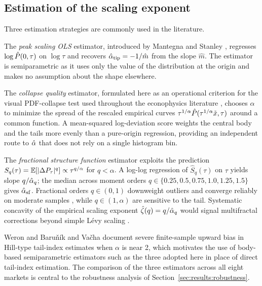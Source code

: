 \documentclass[conference]{IEEEtran}
\begin{document}
\subsection{Estimation of the scaling exponent}
\label{sec:background:estimation}

Three estimation strategies are commonly used in the literature.

The \textit{peak scaling OLS} estimator, introduced by
Mantegna and Stanley \cite{MantegnaStanley1994}, regresses $\log\hat{P}(0,\tau)$ on $\log\tau$ and
recovers $\hat{\alpha}_{\mathrm{tip}} = -1/\hat{m}$ from the slope $\hat{m}$.
The estimator is semiparametric as it uses only the value of the distribution
at the origin and makes no assumption about the shape elsewhere.

The \textit{collapse quality} estimator, formulated here as an operational
criterion for the visual PDF-collapse test used throughout the econophysics
literature \cite{MantegnaStanley1995,Gopikrishnan1999}, chooses
$\alpha$ to minimize the spread of the rescaled empirical curves
$\tau^{1/\alpha}\hat{P}(\tau^{1/\alpha}\tilde{x},\tau)$ around a common function.
A mean-squared log-deviation score weights the central body and the tails
more evenly than a pure-origin regression, providing an independent route to
$\hat{\alpha}$ that does not rely on a single histogram bin.

The \textit{fractional structure function} estimator
\cite{MuzyBacry1993,BouchaudPotters2003,Jiang2019,Saadaoui2024,Masoudi2025} exploits the prediction
$S_q(\tau) = \mathbb{E}[|\Delta P_\tau|^q] \propto \tau^{q/\alpha}$ for $q <
\alpha$. A log-log regression of $\hat{S}_q(\tau)$ on $\tau$ yields
slope $q/\hat{\alpha}_q$; the median across moment orders
$q\in\{0.25,0.5,0.75,1.0,1.25,1.5\}$ gives $\hat{\alpha}_{\mathrm{sf}}$.
Fractional orders $q\in(0,1)$ downweight outliers and converge reliably on
moderate samples \cite{Nolan2020}, while $q\in(1,\alpha)$ are
sensitive to the tail. Systematic concavity of the empirical scaling exponent
$\hat\zeta(q) = q/\hat{\alpha}_q$ would signal multifractal corrections beyond
simple Lévy scaling \cite{Mandelbrot1997,MuzyBacry1993}.

Weron \cite{Weron2001} and Baru\v{n}\'ik and Va\v{c}ha \cite{Barunik2010}
document severe finite-sample upward bias in Hill-type tail-index estimates
when $\alpha$ is near 2, which motivates the use of body-based semiparametric
estimators such as the three adopted here in place of direct tail-index
estimation. The comparison of the three estimators across all eight
markets is central to the robustness analysis of Section~\ref{sec:results:robustness}.
\end{document}
